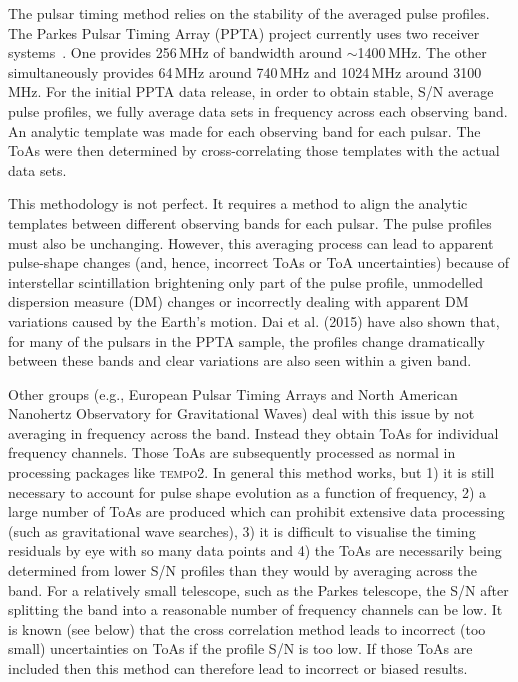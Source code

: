 \documentclass[useAMS,usenatbib]{mn2e}
\begin{document}
The pulsar timing method relies on the stability of the averaged pulse profiles. The Parkes 
Pulsar Timing Array (PPTA) project currently uses two receiver systems~\citep{Manchester13}. 
One provides 256\,MHz of bandwidth around $\sim$1400\,MHz. The other simultaneously provides 
64\,MHz around 740\,MHz and 1024\,MHz around 3100\,MHz. For the initial PPTA data release, 
in order to obtain stable, S/N average pulse profiles, we fully average data sets in frequency 
across each observing band. An analytic template was made for each observing band for each pulsar. 
The ToAs were then determined by cross-correlating those templates with the actual data sets.  

This methodology is not perfect. It requires a method to align the analytic templates 
between different observing bands for each pulsar. The pulse profiles must also be unchanging. 
However, this averaging process can lead to apparent pulse-shape changes (and, hence, incorrect 
ToAs or ToA uncertainties) because of interstellar scintillation brightening only part of the 
pulse profile, unmodelled dispersion measure (DM) changes or incorrectly dealing with 
apparent DM variations caused by the Earth's motion. Dai et al. (2015) have also shown that, 
for many of the pulsars in the PPTA sample, the profiles change dramatically between these bands 
and clear variations are also seen within a given band.

Other groups (e.g., European Pulsar Timing Arrays and North American Nanohertz Observatory for 
Gravitational Waves) deal with this issue by not averaging in frequency across the band. 
Instead they obtain ToAs for individual frequency channels. Those ToAs are subsequently processed 
as normal in processing packages like \textsc{tempo2}. In general this method works, but 1) it 
is still necessary to account for pulse shape evolution as a function of frequency, 2) a large 
number of ToAs are produced which can prohibit extensive data processing (such as gravitational 
wave searches), 3) it is difficult to visualise the timing residuals by eye with so many data 
points and 4) the ToAs are necessarily being determined from lower S/N profiles than they 
would by averaging across the band. For a relatively small telescope, such as the Parkes telescope, 
the S/N after splitting the band into a reasonable number of frequency channels can be low. 
It is known (see below) that the cross correlation method leads to incorrect (too small) 
uncertainties on ToAs if the profile S/N is too low. If those ToAs are included then this 
method can therefore lead to incorrect or biased results. 
\end{document}

